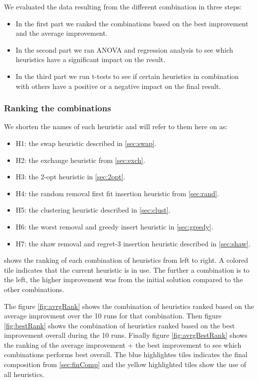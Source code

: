 \documentclass[../main.tex]{subfiles}
\begin{document}
\par We evaluated the data resulting from the different combination in three steps:
\begin{itemize}
    \item In the first part we ranked the combinations based on the best improvement and the average improvement.
    \item In the second part we ran ANOVA and regression analysis to see which heuristics have a significant impact on the result.
    \item In the third part we run t-tests to see if certain heuristics in combination with others have a positive or a negative impact on the final result.
\end{itemize}

\subsubsection{Ranking the combinations}
We shorten the names of each heuristic and will refer to them here on as:
\begin{itemize}
    \item H1: the swap heuristic described in \cref{sec:swap}.
    \item H2: the exchange heuristic from \cref{sec:exch}.
    \item H3: the 2-opt heuristic in \cref{sec:2opt}.
    \item H4: the random removal first fit insertion heuristic from \cref{sec:rand}.
    \item H5: the clustering heuristic described in \cref{sec:clust}.
    \item H6: the worst removal and greedy insert heuristic in \cref{sec:greedy}.
    \item H7: the shaw removal and regret-3 insertion heuristic described in \cref{sec:shaw}.
\end{itemize}

 shows the ranking of each combination of heuristics from left to right.
A colored tile indicates that the current heuristic is in use.
The further a combination is to the left, the higher improvement was from the initial solution compared to the other combinations. \par
The figure \ref{fig:avrgRank} shows the combination of heuristics ranked based on the average improvment over the 10 runs for that combination.
Then figure \ref{fig:bestRank} shows the combination of heuristics ranked based on the best improvement overall during the 10 runs.
Finally figure \ref{fig:avrgBestRank} shows the ranking of the average improvement + the best improvement to see which combinations performs best overall.
The blue highlightes tiles indicates the final composition from \cref{sec:finComp} and the yellow highlighted tiles show the use of all heuristics.
\end{document}
